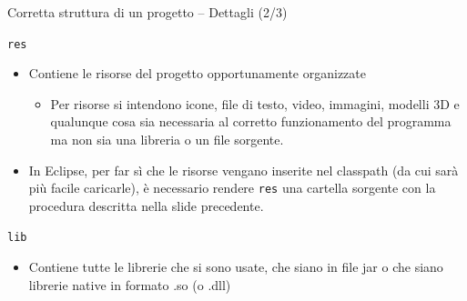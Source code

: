 \documentclass[presentation]{beamer}
\begin{document}
\begin{frame}{Corretta struttura di un progetto -- Dettagli (2/3)}
\begin{block}{\texttt{res}}
\begin{itemize}
\item Contiene le risorse del progetto opportunamente organizzate
\begin{itemize}
\item Per risorse si intendono icone, file di testo, video, immagini, modelli 3D e qualunque cosa sia necessaria al corretto funzionamento del programma ma non sia una libreria o un file sorgente.
\end{itemize}

\item In Eclipse, per far sì che le risorse vengano inserite nel classpath (da cui sarà più facile caricarle), è necessario rendere \texttt{res} una cartella sorgente con la procedura descritta nella slide precedente.
\end{itemize}
\end{block}

\begin{block}{\texttt{lib}}
\begin{itemize}
\item	Contiene tutte le librerie che si sono usate, che siano in file jar o che siano librerie native in formato .so (o .dll)
\end{itemize}
\end{block}
\end{frame}
\end{document}
